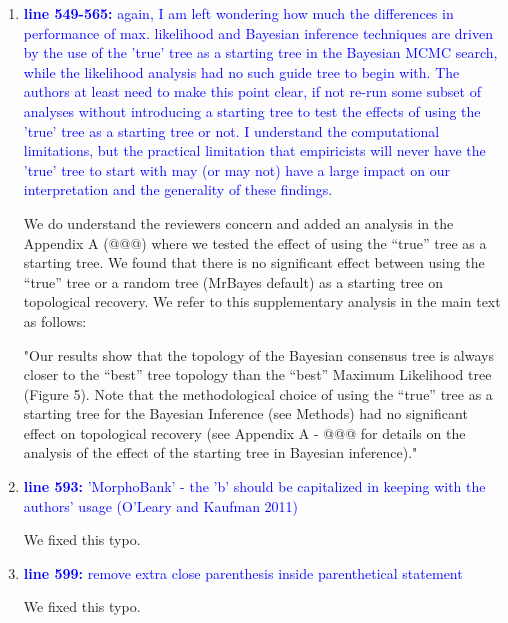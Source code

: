 \documentclass[12pt,letterpaper]{article}
\begin{document}
\begin{enumerate}
\item{\textcolor{blue}{\textbf{line 549-565:} again, I am left wondering how much the differences in performance of max. likelihood and Bayesian inference techniques are driven by the use of the 'true' tree as a starting tree in the Bayesian MCMC search, while the likelihood analysis had no such guide tree to begin with. The authors at least need to make this point clear, if not re-run some subset of analyses without introducing a starting tree to test the effects of using the 'true' tree as a starting tree or not. I understand the computational limitations, but the practical limitation that empiricists will never have the 'true' tree to start with may (or may not) have a large impact on our interpretation and the generality of these findings. }}

We do understand the reviewers concern and added an analysis in the Appendix A (@@@) where we tested the effect of using the ``true'' tree as a starting tree. We found that there is no significant effect between using the ``true'' tree or a random tree (MrBayes default) as a starting tree on topological recovery. We refer to this supplementary analysis in the main text as follows:

"Our results show that the topology of the Bayesian consensus tree is always closer to the ``best'' tree topology than the ``best'' Maximum Likelihood tree (Figure 5).
Note that the methodological choice of using the ``true'' tree as a starting tree for the Bayesian Inference (see Methods) had no significant effect on topological recovery (see Appendix A - @@@ for details on the analysis of the effect of the starting tree in Bayesian inference)."


\item{\textcolor{blue}{\textbf{line 593:} 'MorphoBank' - the 'b' should be capitalized in keeping with the authors' usage (O'Leary and Kaufman 2011)}}

We fixed this typo.

\item{\textcolor{blue}{\textbf{line 599:} remove extra close parenthesis inside parenthetical statement}}

We fixed this typo.


\end{enumerate}
\end{document}
